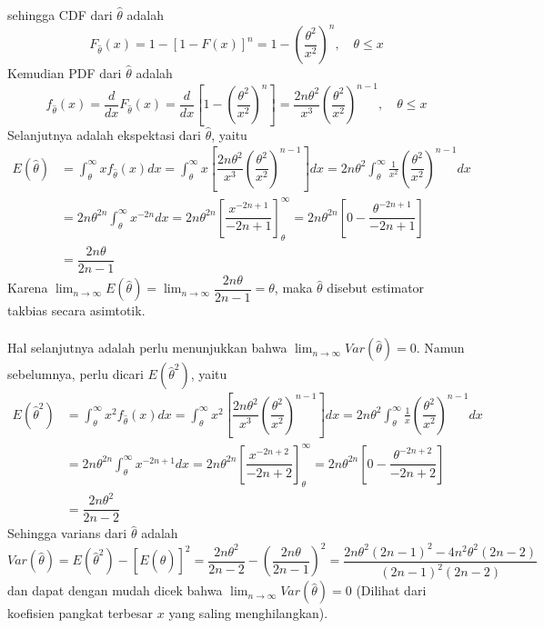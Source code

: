 \documentclass{exam}
\begin{document}
\begin{enumerate}
\begin{solution}
        sehingga CDF dari $\hat{\theta}$ adalah 
        \[F_{\hat{\theta}}(x) = 1-[1-F(x)]^n = 1-\left(\dfrac{\theta^2}{x^2}\right)^n, \quad \theta\leq x\]
        Kemudian PDF dari $\hat{\theta}$ adalah
        \[f_{\hat{\theta}}(x) = \dfrac{d}{dx}F_{\hat{\theta}}(x) = \dfrac{d}{dx}\left[1-\left(\dfrac{\theta^2}{x^2}\right)^n\right] = \dfrac{2n\theta^2}{x^3}\left(\dfrac{\theta^2}{x^2}\right)^{n-1}, \quad \theta\leq x\]
        Selanjutnya adalah ekspektasi dari $\hat{\theta}$, yaitu
        \begin{align*}
            E(\hat{\theta}) &= \int_\theta^\infty x f_{\hat{\theta}}(x)dx = \int_\theta^\infty x\left[\dfrac{2n\theta^2}{x^3}\left(\dfrac{\theta^2}{x^2}\right)^{n-1}\right]dx = 2n\theta^2\int_\theta^\infty \frac{1}{x^2}\left(\dfrac{\theta^2}{x^2}\right)^{n-1}dx\\
            &= 2n\theta^{2n}\int_\theta^\infty x^{-2n}dx = 2n\theta^{2n}\left[\dfrac{x^{-2n+1}}{-2n+1}\right]_\theta^\infty = 2n\theta^{2n}\left[0 - \dfrac{\theta^{-2n+1}}{-2n+1}\right]\\
            &= \dfrac{2n\theta}{2n-1}
        \end{align*}
        Karena $\displaystyle\lim_{n\to\infty}E(\hat{\theta})=\lim_{n\to\infty}\dfrac{2n\theta}{2n-1} = \theta$, maka $\hat{\theta}$ disebut estimator takbias secara asimtotik.\\~\\
        Hal selanjutnya adalah perlu menunjukkan bahwa $\displaystyle\lim_{n\to\infty}Var(\hat{\theta})=0$. Namun sebelumnya, perlu dicari $E(\hat{\theta}^2)$, yaitu
        \begin{align*}
            E(\hat{\theta}^2) &= \int_\theta^\infty x^2 f_{\hat{\theta}}(x)dx = \int_\theta^\infty x^2\left[\dfrac{2n\theta^2}{x^3}\left(\dfrac{\theta^2}{x^2}\right)^{n-1}\right]dx = 2n\theta^2\int_\theta^\infty \frac{1}{x}\left(\dfrac{\theta^2}{x^2}\right)^{n-1}dx\\
            &= 2n\theta^{2n}\int_\theta^\infty x^{-2n+1}dx = 2n\theta^{2n}\left[\dfrac{x^{-2n+2}}{-2n+2}\right]_\theta^\infty = 2n\theta^{2n}\left[0 - \dfrac{\theta^{-2n+2}}{-2n+2}\right]\\
            &= \dfrac{2n\theta^2}{2n-2}
        \end{align*}
        Sehingga varians dari $\hat{\theta}$ adalah
        \[Var(\hat{\theta}) = E(\hat{\theta}^2) - [E(\hat{\theta})]^2 = \dfrac{2n\theta^2}{2n-2} - \left(\dfrac{2n\theta}{2n-1}\right)^2 = \dfrac{2n\theta^2(2n-1)^2 - 4n^2\theta^2(2n-2)}{(2n-1)^2(2n-2)}\]
        dan dapat dengan mudah dicek bahwa $\displaystyle\lim_{n\to\infty}Var(\hat{\theta})=0$ (Dilihat dari koefisien pangkat terbesar $x$ yang saling menghilangkan).\\~\\

\end{solution}
\end{enumerate}
\end{document}
